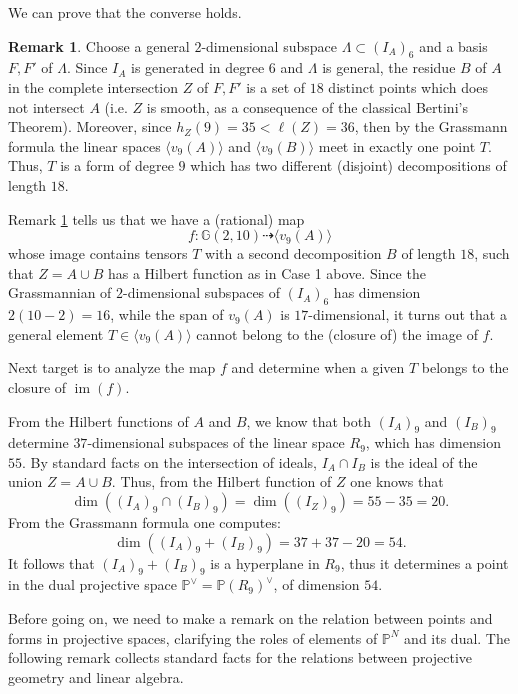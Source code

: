 \documentclass{amsart}
\newcommand{\Pj}{\mathbb{P}}
\newcommand{\G}{\mathbb{G}}
\newcommand{\imm}{\operatorname{im}}
\theoremstyle{definition}
\newtheorem{rem0}[thm0]{Remark}
\begin{document}
We can prove that the converse holds. 

\begin{rem0} \label{converse} Choose a general $2$-dimensional subspace $\Lambda\subset (I_A)_6$ and a basis
$F,F'$ of $\Lambda$. Since $I_A$ is generated in degree $6$ and $\Lambda$ is general, the residue $B$ of $A$ in the complete intersection $Z$
of $F,F'$ is a set of $18$ distinct points which does not intersect $A$ (i.e. $Z$ is smooth, as a consequence of the classical Bertini's Theorem). 
Moreover, since $h_Z(9)=35<\ell(Z)=36$, then by the Grassmann formula
the linear spaces $\langle v_9(A)\rangle$ and $\langle v_9(B)\rangle$ meet in exactly one point $T$. Thus, $T$ is a form of degree $9$ 
which has two different (disjoint) decompositions of length $18$.
\end{rem0}


Remark \ref{converse} tells us that we have a (rational) map
\begin{equation}\label{effe}    f : \G(2,10) \dasharrow \langle v_9(A) \rangle \end{equation}
whose image contains tensors $T$ with a second decomposition $B$ of length $18$, such that $Z=A\cup B$ has a Hilbert function as in Case 1 above.
Since the Grassmannian of $2$-dimensional subspaces of $(I_A)_6$ has dimension $2(10-2)=16$, while the span of $v_9(A)$ is $17$-dimensional,
it turns out that a general element  $T\in \langle v_9(A)\rangle$ cannot belong to the (closure of) the image of $f$. 
\smallskip

Next target is to analyze the map $f$ and determine when a given $T$ belongs to the closure of $\imm(f)$.
\medskip

From the Hilbert functions of $A$ and $B$, we know that both $(I_A)_9$ and $(I_B)_9$ determine $37$-dimensional subspaces of the linear space
$R_9$, which has dimension $55$. By standard facts on the intersection of ideals, $I_A\cap I_B$ is the ideal of the union $Z=A\cup B$. Thus, from the Hilbert
function of $Z$ one knows that 
$$ \dim( (I_A)_9\cap (I_B)_9) = \dim((I_Z)_9)= 55-35 = 20.$$
From the Grassmann formula one computes:
$$\dim( (I_A)_9+ (I_B)_9 ) = 37+37-20=54.$$
It follows that $ (I_A)_9+ (I_B)_9$ is a hyperplane in $R_9$,  thus it determines a point in the dual projective space
$\Pj^\vee=\Pj(R_9)^\vee$, of dimension $54$.


Before going on, we need to make a remark on the relation between points and forms in projective spaces, clarifying the roles
of elements of $\Pj^N$ and its dual. The following remark collects standard facts for the
relations between projective geometry and linear algebra.
\end{document}

